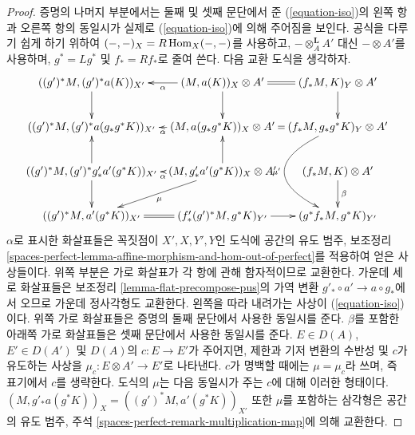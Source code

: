 \begin{proof}
\medskip\noindent
증명의 나머지 부분에서는 둘째 및 셋째 문단에서 준
(\ref{equation-iso})의 왼쪽 항과 오른쪽 항의 동일시가 실제로
(\ref{equation-iso})에 의해 주어짐을 보인다. 공식을 다루기 쉽게 하기
위하여 $(-, -)_X = R\mathop{\mathrm{Hom}}\nolimits_X(-, -)$를 사용하고,
$- \otimes_A^\mathbf{L} A'$ 대신 $- \otimes A'$를 사용하며,
$g^* = Lg^*$ 및 $f_* = Rf_*$로 줄여 쓴다. 다음 교환 도식을 생각하자.
$$
\xymatrix@C=.4em{
((g')^*M, (g')^*a(K))_{X'} \ar[d] &
(M, a(K))_X \otimes A' \ar[l]^-\alpha \ar[d] &
(f_*M, K)_Y \otimes A' \ar@{=}[l] \ar[d] \\
((g')^*M, (g')^*a(g_*g^*K))_{X'} &
(M, a(g_*g^*K))_X \otimes A' \ar[l]^-\alpha &
(f_*M, g_*g^*K)_Y \otimes A' \ar@{=}[l] \ar@/_4pc/[dd]_{\mu'} \\
((g')^*M, (g')^*g'_*a'(g^*K))_{X'} \ar[u] \ar[d] &
(M, g'_*a'(g^*K))_X \otimes A' \ar[u] \ar[l]^-\alpha \ar[ld]^\mu &
(f_*M, K) \otimes A' \ar[d]^\beta \\
((g')^*M, a'(g^*K))_{X'} &
(f'_*(g')^*M, g^*K)_{Y'} \ar@{=}[l] \ar[r] &
(g^*f_*M, g^*K)_{Y'}
}
$$
$\alpha$로 표시한 화살표들은 꼭짓점이 $X', X, Y', Y$인 도식에
공간의 유도 범주, 보조정리
\ref{spaces-perfect-lemma-affine-morphism-and-hom-out-of-perfect}를
적용하여 얻은 사상들이다. 위쪽 부분은 가로 화살표가 각 항에 관해
함자적이므로 교환한다. 가운데 세로 화살표들은 보조정리
\ref{lemma-flat-precompose-pus}의 가역 변환
$g'_* \circ a' \to a \circ g_*$에서 오므로 가운데 정사각형도 교환한다.
왼쪽을 따라 내려가는 사상이 (\ref{equation-iso})이다.
위쪽 가로 화살표들은 증명의 둘째 문단에서 사용한 동일시를 준다.
$\beta$를 포함한 아래쪽 가로 화살표들은 셋째 문단에서 사용한
동일시를 준다. $E \in D(A)$, $E' \in D(A')$ 및
$D(A)$의 $c : E \to E'$가 주어지면, 제한과 기저 변환의 수반성 및
$c$가 유도하는 사상을
$\mu_c : E \otimes A' \to E'$로 나타낸다. $c$가 명백할 때에는
$\mu = \mu_c$라 쓰며, 즉 표기에서 $c$를 생략한다. 도식의 $\mu$는
다음 동일시가 주는 $c$에 대해 이러한 형태이다.
$(M, g'_*a(g^*K))_X = ((g')^*M, a'(g^*K))_{X'}$
또한 $\mu$를 포함하는 삼각형은 공간의 유도 범주, 주석
\ref{spaces-perfect-remark-multiplication-map}에 의해 교환한다.


\end{proof}
